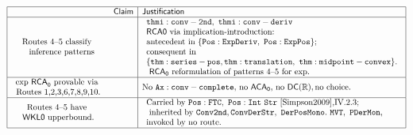 \documentclass[11pt,reqno]{amsart}
\theoremstyle{redplain}
\numberwithin{equation}{section}
\begin{document}
\begin{center}
$%
\begin{array}{|cr|l|}
\hline
& \mathsf{Claim} & \mathsf{Justification} \\ \hline
\begin{array}{r}
\text{Routes 4--5 classify } \\ 
\text{inference patterns}%
\end{array}
&  & 
\begin{array}{l}
\mathtt{thmi:conv-2nd},\text{ }\mathtt{thmi:conv-deriv}\text{ } \\ 
\text{\textsf{RCA0 }via implication-introduction:} \\ 
\text{antecedent in }\{\mathtt{Pos:ExpDeriv},\text{ }\mathtt{Pos:ExpPos}\};
\\ 
\text{consequent in } \\ 
\{\mathtt{thm:series-pos},\mathtt{thm:translation},\text{ }\mathtt{%
thm:midpoint-convex}\}. \\ 
\text{ \textsf{RCA}}_{\text{\textsf{0}}}\text{\textsf{\ }reformulation of
patterns 4--5 for exp.}%
\end{array}
\\ \hline
\begin{array}{c}
\text{exp \textsf{RCA}}_{\text{\textsf{0}}}\text{ provable via } \\ 
\text{Routes\ 1,2,3,6,7,8,9,10.}%
\end{array}
&  & \text{No }\mathtt{Ax:conv-complete,\ }\text{no \textsf{ACA}}_{\text{%
\textsf{0}}}\text{, no \textsf{DC}}\mathsf{(}%
\mathbb{R}
\mathsf{)},\text{no choice.} \\ \hline
\begin{array}{c}
\text{Routes 4--5 have } \\ 
\text{\textsf{WKL0 }upperbound.}%
\end{array}
&  & 
\begin{array}{l}
\text{Carried by }\mathtt{Pos:FTC},\text{ }\mathtt{Pos:Int}\text{ }\mathtt{%
Str}\text{ \cite{Simpson2009},IV.2.3;} \\ 
\text{ inherited by }\mathtt{Conv2nd},\mathtt{ConvDerStr},\text{ }\mathtt{%
DerPosMono}.\text{ }\mathtt{MVT},\text{ }\mathtt{PDerMon}\text{, } \\ 
\text{invoked by no route}.%
\end{array}
\\ \hline
\end{array}%
${\small \ }

\bigskip
\end{center}
\end{document}
